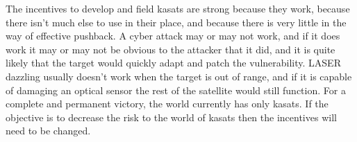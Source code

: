 The incentives to develop and field \acp{kasat} are strong because
they work, because there isn't much else to use in their place, and
because there is very little in the way of effective pushback.  A
cyber attack may or may not work, and if it does work it may or may
not be obvious to the attacker that it did, and it is quite likely
that the target would quickly adapt and patch the vulnerability.
LASER dazzling usually doesn't work when the target is out of range,
and if it is capable of damaging an optical sensor the rest of the
satellite would still function.  For a complete and permanent victory,
the world currently has only \acp{kasat}.  If the objective is to
decrease the risk to the world of \acp{kasat} then the incentives will
need to be changed.
